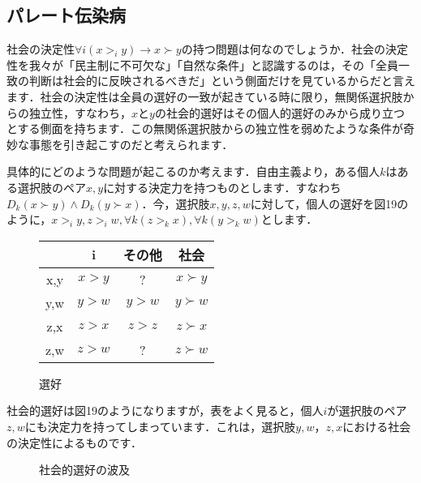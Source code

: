 \subsection{パレート伝染病}
社会の決定性$\forall i (x >_i y) \to x \succ y$の持つ問題は何なのでしょうか．社会の決定性を我々が「民主制に不可欠な」「自然な条件」と認識するのは，その「全員一致の判断は社会的に反映されるべきだ」という側面だけを見ているからだと言えます．社会の決定性は全員の選好の一致が起きている時に限り，無関係選択肢からの独立性，すなわち，$x$と$y$の社会的選好はその個人的選好のみから成り立つとする側面を持ちます．この無関係選択肢からの独立性を弱めたような条件が奇妙な事態を引き起こすのだと考えられます．

具体的にどのような問題が起こるのか考えます．自由主義より，ある個人$k$はある選択肢のペア$x,y$に対する決定力を持つものとします．すなわち$D_k(x\succ y) \land D_k(y \succ x)$．今，選択肢$x,y,z,w$に対して，個人の選好を図19のように，$x >_i y, z >_i w, \forall k (z >_k x), \forall k (y >_k w)$とします．

\begin{figure}[!h]
    \centering
    \begin{tabular}[!h]{|c|c|c|c|} \hline
        & i & その他 & 社会 \\ \hline
        x,y & $x > y$ &    ?    & $x \succ y$ \\ \hline
        y,w & $y > w$ & $y > w$ & $y \succ w$ \\ \hline
        z,x & $z > x$ & $z > z$ & $z \succ x$ \\ \hline
        z,w & $z > w$ &    ?    & $z \succ w$ \\\hline
    \end{tabular}
    \caption{選好}
\end{figure}

社会的選好は図19のようになりますが，表をよく見ると，個人$i$が選択肢のペア$z,w$にも決定力を持ってしまっています．これは，選択肢$y,w$，$z,x$における社会の決定性によるものです．

\begin{figure}[!h]
    \centering
    \caption{社会的選好の波及}
\end{figure}

